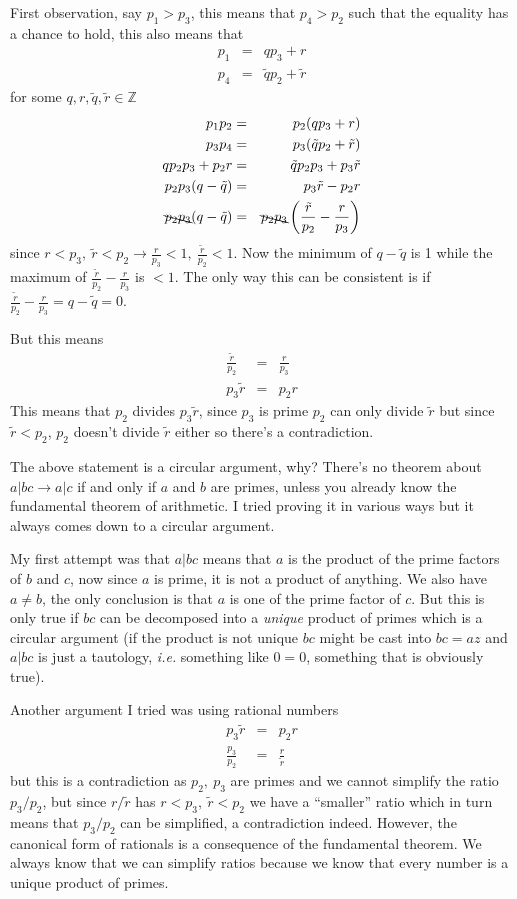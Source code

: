 \documentclass[aps,preprint,preprintnumbers,nofootinbib,showpacs,prd]{revtex4-1}
\newcommand{\ie}{{\it i.e.} }
\newcommand{\nbea}{\begin{eqnarray*}}
\newcommand{\neea}{\end{eqnarray*}}
\begin{document}
First observation, say $p_1 >p_3$, this means that $p_4 > p_2$ such that the equality has a chance to hold, this also means that
%
\nbea
p_1 & = & q p_3 + r \\
p_4 & = & \tilde q p_2 + \tilde r
\neea
%
for some $q,r,\tilde q, \tilde r \in \mathbb{Z}$
%
\nbea
p_1 p_2 & = & p_2 (q p_3 + r) \\
p_3 p_4 & = & p_3 (\tilde q p_2 + \tilde r) \\
q p_2 p_3 + p_2 r & = & \tilde q p_2 p_3 + p_3 \tilde r \\
p_2 p_3 (q - \tilde q) & = & p_3 \tilde r - p_2 r\\
\bcancel{p_2 p_3} (q - \tilde q)  & = & \bcancel{p_2 p_3} \left (\frac{\tilde r}{p_2} - \frac{r}{p_3} \right )
\neea
%
since $r < p_3, ~ \tilde r < p_2 \to \frac{r}{p_3} < 1, ~ \frac{\tilde r}{p_2} < 1$. Now the minimum of $q - \tilde q$ is 1 while the maximum of $\frac{\tilde r}{p_2} - \frac{r}{p_3}$ is $< 1$. The only way this can be consistent is if $\frac{\tilde r}{p_2} - \frac{r}{p_3} = q - \tilde q = 0$.

But this means
%
\nbea
\frac{\tilde r}{p_2} & = & \frac{r}{p_3} \\
p_3 \tilde r & = & p_2 r
\neea
%
This means that $p_2$ divides $p_3 \tilde r$, since $p_3$ is prime $p_2$ can only divide $\tilde r$ but since $\tilde r < p_2$, $p_2$ doesn't divide $\tilde r$ either so there's a contradiction.

The above statement is a circular argument, why? There's no theorem about $a|bc \to a | c$ if and only if $a$ and $b$ are primes, unless you already know the fundamental theorem of arithmetic. I tried proving it in various ways but it always comes down to a circular argument.

My first attempt was that $a | b c$ means that $a$ is the product of the prime factors of $b$ and $c$, now since $a$ is prime, it is not a product of anything. We also have $a \neq b$, the only conclusion is that $a$ is one of the prime factor of $c$. But this is only true if $b c$ can be decomposed into a {\it unique} product of primes which is a circular argument (if the product is not unique $b c$ might be cast into $b c = a z$ and $a | bc$ is just a tautology, \ie something like $0=0$, something that is obviously true).

Another argument I tried was using rational numbers
%
\nbea
p_3 \tilde r & = & p_2 r \\
\frac{p_3}{p_2} & = & \frac{r}{\tilde r}
\neea
%
but this is a contradiction as $p_2,~p_3$ are primes and we cannot simplify the ratio $p_3/p_2$, but since $r / \tilde r$ has $r < p_3,~\tilde r < p_2$ we have a ``smaller'' ratio which in turn means that $p_3/p_2$ can be simplified, a contradiction indeed. However, the canonical form of rationals is a consequence of the fundamental theorem. We always know that we can simplify ratios because we know that every number is a unique product of primes. 
\end{document}
